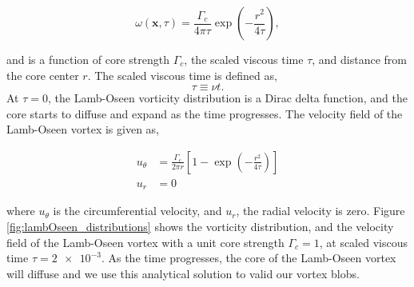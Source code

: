 	\begin{equation}
	\omega\left(\mathbf{x},\tau\right) = \frac{\Gamma_c}{4\pi\tau} \exp\left(-\frac{r^2}{4\tau}\right),
	\end{equation}

and is a function of core strength $\Gamma_c$, the scaled viscous time $\tau$, and distance from the core center $r$. The scaled viscous time is defined as,
	\begin{equation}
	\tau \equiv \nu t.
	\end{equation}
At $\tau=0$, the Lamb-Oseen vorticity distribution is a Dirac delta function, and the core starts to diffuse and expand as the time progresses. The velocity field of the Lamb-Oseen vortex is given as,

	\begin{subequations}
	\begin{align}
	u_{\theta} &= \frac{\Gamma_c}{2\pi r} \left[1-\exp\left(-\frac{r^2}{4\tau}\right)\right]\\
	u_r &= 0
	\end{align}
	\end{subequations}

where $u_{\theta}$ is the circumferential velocity, and $u_r$, the radial velocity is zero. Figure \ref{fig:lambOseen_distributions} shows the vorticity distribution, and the velocity field of the Lamb-Oseen vortex with a unit core strength $\Gamma_c=1$, at scaled viscous time $\tau=\num{2e-3}$. As the time progresses, the core of the Lamb-Oseen vortex will diffuse and we use this analytical solution to valid our vortex blobs.

